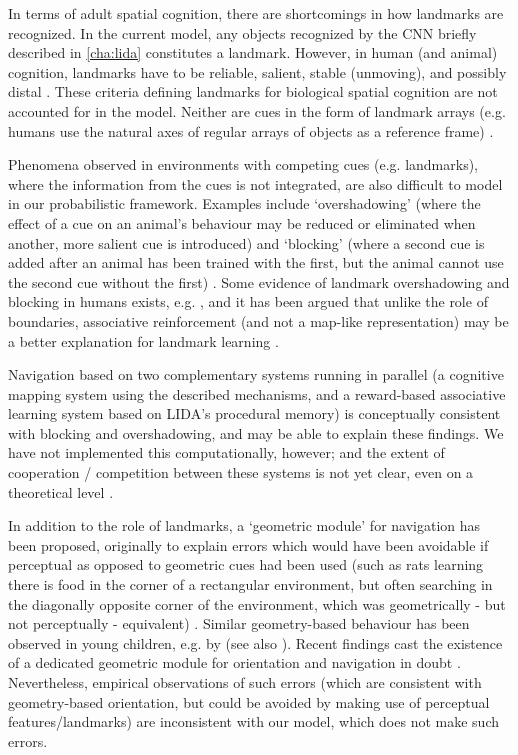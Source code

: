 In terms of adult spatial cognition, there are shortcomings in how landmarks are recognized. In the current model, any objects recognized by the CNN briefly described in \ref{cha:lida} constitutes a landmark. However, in human (and animal) cognition, landmarks have to be reliable, salient, stable (unmoving), and possibly distal \citep{lew2011looking}. These criteria defining landmarks for biological spatial cognition are not accounted for in the model. Neither are cues in the form of landmark arrays (e.g. humans use the natural axes of regular arrays of objects as a reference frame) \citep{lew2011looking, burgess2006spatial}. 

Phenomena observed in environments with competing cues (e.g. landmarks), where the information from the cues is not integrated, are also difficult to model in our probabilistic framework. Examples include `overshadowing' (where the effect of a cue on an animal's behaviour may be reduced or eliminated when another, more salient cue is introduced) and `blocking' (where a second cue is added after an animal has been trained with the first, but the animal cannot use the second cue without the first) \citep{chamizo2003acquisition}. Some evidence of landmark overshadowing and blocking in humans exists, e.g. \citep{spetch1995overshadowing, prados2011blocking}, and it has been argued that unlike the role of boundaries, associative reinforcement (and not a map-like representation) may be a better explanation for landmark learning \citep{doeller2008distinct}. 

Navigation based on two complementary systems running in parallel (a cognitive mapping system using the described mechanisms, and a reward-based associative learning system based on LIDA's procedural memory) is conceptually consistent with blocking and overshadowing, and may be able to explain these findings. We have not implemented this computationally, however; and the extent of cooperation / competition between these systems is not yet clear, even on a theoretical level \citep{lew2011looking, cheng201325}.

In addition to the role of landmarks, a `geometric module' for navigation has been proposed, originally to explain errors which would have been avoidable if perceptual as opposed to geometric cues had been used (such as rats learning there is food in the corner of a rectangular environment, but often searching in the diagonally opposite corner of the environment, which was geometrically - but not perceptually - equivalent) \citep{cheng1986purely}. Similar geometry-based behaviour has been observed in young children, e.g. by \cite{huttenlocher1999spatial} (see also \citep{cheng201325}). Recent findings cast the existence of a dedicated geometric module for orientation and navigation in doubt \citep{cheng2008whither}. Nevertheless, empirical observations of such errors (which are consistent with geometry-based orientation, but could be avoided by making use of perceptual features/landmarks) are inconsistent with our model, which does not make such errors.

